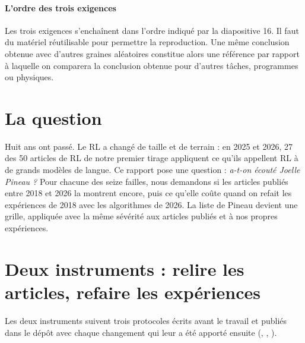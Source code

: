 \paragraph{L'ordre des trois exigences}
Les trois exigences s'enchaînent dans l'ordre indiqué par la diapositive 16. Il faut du matériel
réutilisable pour permettre la reproduction. Une même conclusion obtenue avec d'autres graines
aléatoires constitue alors une référence par rapport à laquelle on comparera la conclusion obtenue pour
d'autres tâches, programmes ou physiques.

\section{La question}\label{sec:intro-question}

Huit ans ont passé. Le RL a changé de taille et de terrain : en 2025 et 2026, 27 des 50 articles de RL
de notre premier tirage appliquent ce qu'ils appellent RL à de grands modèles de langue.
Ce rapport pose une question : \emph{a-t-on écouté Joelle Pineau ?} Pour chacune des seize failles,
nous demandons si les articles publiés entre 2018 et 2026 la montrent encore, puis ce qu'elle coûte
quand on refait les expériences de 2018 avec les algorithmes de 2026. La liste de Pineau devient une
grille, appliquée avec la même sévérité aux articles publiés et à nos propres expériences.

\section{Deux instruments : relire les articles, refaire les expériences}\label{sec:intro-instruments}

Les deux instruments suivent trois protocoles écrits avant le travail et publiés dans le dépôt avec
chaque changement qui leur a été apporté ensuite (, ,
).

